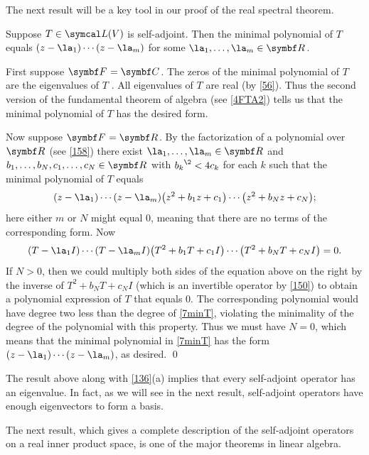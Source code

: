 The next result will be a key tool in our proof of the real spectral theorem.

{Suppose $T \in \L(V)$ is self-adjoint. Then the minimal polynomial of $T$ equals
$(z-\la_1) \cdots (z-\la_m)$ for some $\la_1, \ldots, \la_m \in \R{}$.}

\proof
First suppose $\F{} = \C{}$. The zeros of the minimal polynomial of $T$ are the eigenvalues of $T$ . All eigenvalues of $T$ are real (by \ref{56}). Thus the second version of the fundamental theorem of algebra (see \ref{4FTA2}) tells us that the minimal polynomial of $T$ has the desired form.

Now suppose $\F{} = \R{}$. By the factorization of a polynomial over $\R{}$ (see \ref{158}) there exist $\la_1, \dots, \la_m \in \R{}$ and $b_1, \dots, b_N, c_1, \dots, c_N \in \R{}$ with ${b_k}^{\2} < 4c_k$ for each $k$ such that the minimal polynomial of $T$ equals
\begin{equation} \label{7minT}
(z - \la_1) \cdots(z - \la_m)
\paren[\big]{z^2 + b_1 z + c_1} \cdots \paren[\big]{z^2 + b_N z + c_N};
\end{equation}%
here either $m$ or $N$ might equal $0$, meaning that there are no terms of the corresponding form. Now
\[
(T - \la_1 I) \cdots(T - \la_m I)
\paren[\big]{T^2 + b_1 T + c_1 I} \cdots \paren[\big]{T^2 + b_N T + c_N I} = 0.
\]
If $N> 0$, then we could multiply both sides of the equation above on the right by the inverse of $T^2 + b_N T + c_N I$ (which is an invertible operator by \ref{150}) to obtain a polynomial expression of $T$ that equals $0$. The corresponding polynomial would have degree two less than the degree of \ref{7minT}, violating the minimality of the degree of the polynomial with this property. Thus we must have $N=0$, which means that the minimal polynomial in \ref{7minT} has the form $(z - \la_1) \cdots(z - \la_m)$, as desired.
\qed

The result above along with \ref{136}(a) implies that every self-adjoint operator has an eigenvalue. In fact, as we will see in the next result, self-adjoint operators have enough eigenvectors to form a basis.

The next result, which gives a complete description of the self-adjoint operators on a real inner product space, is one of the major theorems in linear algebra.


